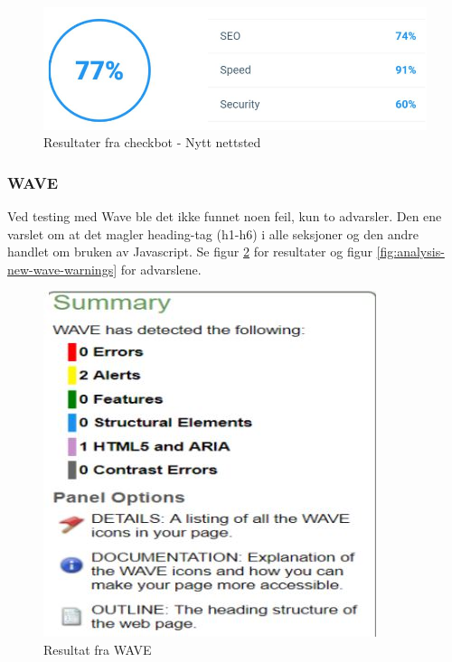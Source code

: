 \begin{figure}[H]
    \centering
    \includegraphics[width=\textwidth]{bereket/Checkbot-test-ny-nettsted.png}
    \caption{Resultater fra checkbot - Nytt nettsted}
    \label{fig:analysis-new-checkbot-summary}
\end{figure}


\subsubsection{WAVE}
Ved testing med Wave ble det ikke funnet noen feil, kun to advarsler. Den ene varslet om at det magler heading-tag (h1-h6) i alle seksjoner og den andre handlet om bruken av Javascript. Se figur \ref{fig:analysis-new-wave-summary} for resultater og figur \ref{fig:analysis-new-wave-warnings} for advarslene.

\begin{figure}[H]
    \centering
    \includegraphics[width=.5\textwidth]{bereket/Wave-test-ny-nettsted.png}
    \caption{Resultat fra WAVE}
    \label{fig:analysis-new-wave-summary}
\end{figure}

